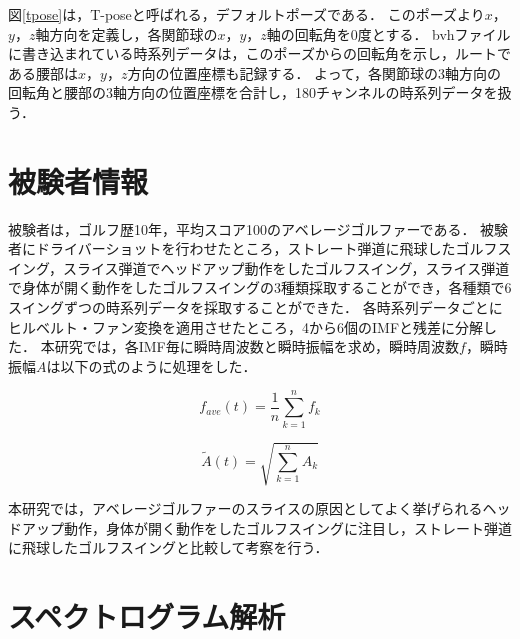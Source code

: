 図\ref{tpose}は，T-poseと呼ばれる，デフォルトポーズである．
このポーズより$x$，$y$，$z$軸方向を定義し，各関節球の$x$，$y$，$z$軸の回転角を0度とする．
bvhファイルに書き込まれている時系列データは，このポーズからの回転角を示し，ルートである腰部は$x$，$y$，$z$方向の位置座標も記録する．
よって，各関節球の3軸方向の回転角と腰部の3軸方向の位置座標を合計し，180チャンネルの時系列データを扱う．

\section{被験者情報}
被験者は，ゴルフ歴10年，平均スコア100のアベレージゴルファーである．
被験者にドライバーショットを行わせたところ，ストレート弾道に飛球したゴルフスイング，スライス弾道でヘッドアップ動作をしたゴルフスイング，スライス弾道で身体が開く動作をしたゴルフスイングの3種類採取することができ，各種類で6スイングずつの時系列データを採取することができた．
各時系列データごとにヒルベルト・ファン変換を適用させたところ，4から6個のIMFと残差に分解した．
本研究では，各IMF毎に瞬時周波数と瞬時振幅を求め，瞬時周波数$f$，瞬時振幅$A$は以下の式のように処理をした．

\begin{equation}
    f_{ave}(t) = \frac{1}{n} \sum_{k=1}^{n} f_{k}
\end{equation}

\begin{equation}
    \tilde{A}(t) = \sqrt{\sum_{k=1}^{n} A_{k}}
\end{equation}

本研究では，アベレージゴルファーのスライスの原因としてよく挙げられるヘッドアップ動作，身体が開く動作をしたゴルフスイングに注目し，ストレート弾道に飛球したゴルフスイングと比較して考察を行う．

\section{スペクトログラム解析}
